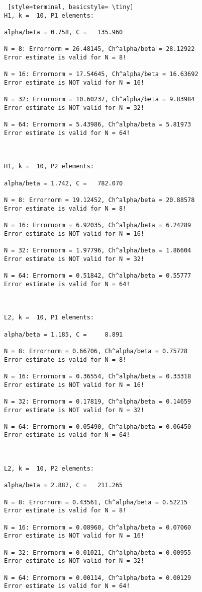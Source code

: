 \documentclass[a4paper,english,12pt,twoside]{article}
\begin{document}
\newpage
\begin{lstlisting} [style=terminal, basicstyle= \tiny]
H1, k =  10, P1 elements:

alpha/beta = 0.758, C =   135.960

N = 8: Errornorm = 26.48145, Ch^alpha/beta = 28.12922
Error estimate is valid for N = 8!

N = 16: Errornorm = 17.54645, Ch^alpha/beta = 16.63692
Error estimate is NOT valid for N = 16!

N = 32: Errornorm = 10.60237, Ch^alpha/beta = 9.83984
Error estimate is NOT valid for N = 32!

N = 64: Errornorm = 5.43986, Ch^alpha/beta = 5.81973
Error estimate is valid for N = 64!



H1, k =  10, P2 elements:

alpha/beta = 1.742, C =   782.070

N = 8: Errornorm = 19.12452, Ch^alpha/beta = 20.88578
Error estimate is valid for N = 8!

N = 16: Errornorm = 6.92035, Ch^alpha/beta = 6.24289
Error estimate is NOT valid for N = 16!

N = 32: Errornorm = 1.97796, Ch^alpha/beta = 1.86604
Error estimate is NOT valid for N = 32!

N = 64: Errornorm = 0.51842, Ch^alpha/beta = 0.55777
Error estimate is valid for N = 64!



L2, k =  10, P1 elements:

alpha/beta = 1.185, C =     8.891

N = 8: Errornorm = 0.66706, Ch^alpha/beta = 0.75728
Error estimate is valid for N = 8!

N = 16: Errornorm = 0.36554, Ch^alpha/beta = 0.33318
Error estimate is NOT valid for N = 16!

N = 32: Errornorm = 0.17819, Ch^alpha/beta = 0.14659
Error estimate is NOT valid for N = 32!

N = 64: Errornorm = 0.05490, Ch^alpha/beta = 0.06450
Error estimate is valid for N = 64!



L2, k =  10, P2 elements:

alpha/beta = 2.887, C =   211.265

N = 8: Errornorm = 0.43561, Ch^alpha/beta = 0.52215
Error estimate is valid for N = 8!

N = 16: Errornorm = 0.08960, Ch^alpha/beta = 0.07060
Error estimate is NOT valid for N = 16!

N = 32: Errornorm = 0.01021, Ch^alpha/beta = 0.00955
Error estimate is NOT valid for N = 32!

N = 64: Errornorm = 0.00114, Ch^alpha/beta = 0.00129
Error estimate is valid for N = 64!
\end{lstlisting}
\end{document}
